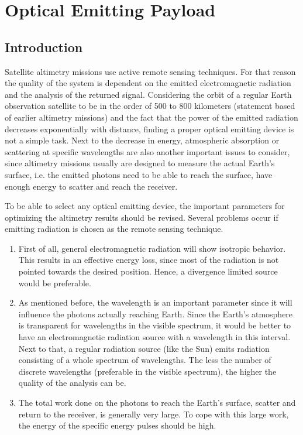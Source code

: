 \section{Optical Emitting Payload}
	\label{blDOLSR}
		\subsection{Introduction}
Satellite altimetry missions use active remote sensing techniques. For that reason the quality of the system is dependent on the emitted electromagnetic radiation and the analysis of the returned signal. Considering the orbit of a regular Earth observation satellite to be in the order of 500 to 800 kilometers (statement based of earlier altimetry missions) and the fact that the power of the emitted radiation decreases exponentially with distance, finding a proper optical emitting device is not a simple task. Next to the decrease in energy, atmospheric absorption or scattering at specific wavelengths are also another important issues to consider, since altimetry missions usually are designed to measure the actual Earth's surface, i.e. the emitted photons need to be able to reach the surface, have enough energy to scatter and reach the receiver.

To be able to select any optical emitting device, the important parameters for optimizing the altimetry results should be revised. Several problems occur if emitting radiation is chosen as the remote sensing technique. 
\begin{enumerate}[i]
	\item First of all, general electromagnetic radiation will show isotropic behavior. This results in an effective energy loss, since most of the radiation is not pointed towards the desired position. Hence, a divergence limited source would be preferable.
	\item As mentioned before, the wavelength is an important parameter since it will influence the photons actually reaching Earth. Since the Earth's atmosphere is transparent for wavelengths in the visible spectrum, it would be better to have an electromagnetic radiation source with a wavelength in this interval. Next to that, a regular radiation source (like the Sun) emits radiation consisting of a whole spectrum of wavelengths. The less the number of discrete wavelengths (preferable in the visible spectrum), the higher the quality of the analysis can be.
	\item The total work done on the photons to reach the Earth's surface, scatter and return to the receiver, is generally very large. To cope with this large work, the energy of the specific energy pulses should be high.  
\end{enumerate}

